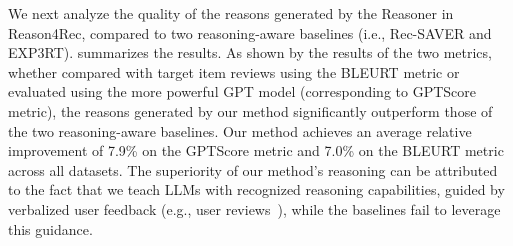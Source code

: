 \vspace{+5pt}
We next analyze the quality of the reasons generated by the Reasoner in  Reason4Rec, compared to two reasoning-aware baselines (i.e., Rec-SAVER and EXP3RT).  summarizes the results. 
As shown by the results of the two metrics, whether compared with target item reviews using the BLEURT metric or evaluated using the more powerful GPT model (corresponding to GPTScore metric),
the reasons generated by our method significantly outperform those of the two reasoning-aware baselines. 
Our method achieves an average relative improvement of 7.9\% on the GPTScore metric and 7.0\% on the BLEURT metric across all datasets. The superiority of our method’s reasoning can be attributed to the fact that we teach LLMs with recognized reasoning capabilities, guided by verbalized user feedback (e.g., user reviews~\cite{ReviewRecSurvey}), while the baselines fail to leverage this guidance.






